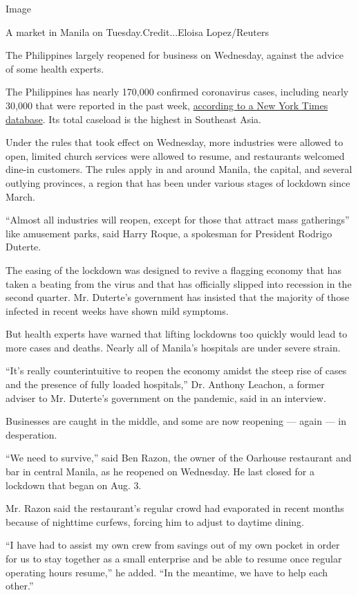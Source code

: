 Image

A market in Manila on Tuesday.Credit...Eloisa Lopez/Reuters

The Philippines largely reopened for business on Wednesday, against the
advice of some health experts.

The Philippines has nearly 170,000 confirmed coronavirus cases,
including nearly 30,000 that were reported in the past week,
\href{https://www.nytimes3xbfgragh.onion/interactive/2020/world/coronavirus-maps.html\#countries}{according
to a New York Times database}. Its total caseload is the highest in
Southeast Asia.

Under the rules that took effect on Wednesday, more industries were
allowed to open, limited church services were allowed to resume, and
restaurants welcomed dine-in customers. The rules apply in and around
Manila, the capital, and several outlying provinces, a region that has
been under various stages of lockdown since March.

``Almost all industries will reopen, except for those that attract mass
gatherings'' like amusement parks, said Harry Roque, a spokesman for
President Rodrigo Duterte.

The easing of the lockdown was designed to revive a flagging economy
that has taken a beating from the virus and that has officially slipped
into recession in the second quarter. Mr. Duterte's government has
insisted that the majority of those infected in recent weeks have shown
mild symptoms.

But health experts have warned that lifting lockdowns too quickly would
lead to more cases and deaths. Nearly all of Manila's hospitals are
under severe strain.

``It's really counterintuitive to reopen the economy amidst the steep
rise of cases and the presence of fully loaded hospitals,'' Dr. Anthony
Leachon, a former adviser to Mr. Duterte's government on the pandemic,
said in an interview.

Businesses are caught in the middle, and some are now reopening ---
again --- in desperation.

``We need to survive,'' said Ben Razon, the owner of the Oarhouse
restaurant and bar in central Manila, as he reopened on Wednesday. He
last closed for a lockdown that began on Aug. 3.

Mr. Razon said the restaurant's regular crowd had evaporated in recent
months because of nighttime curfews, forcing him to adjust to daytime
dining.

``I have had to assist my own crew from savings out of my own pocket in
order for us to stay together as a small enterprise and be able to
resume once regular operating hours resume,'' he added. ``In the
meantime, we have to help each other.''

